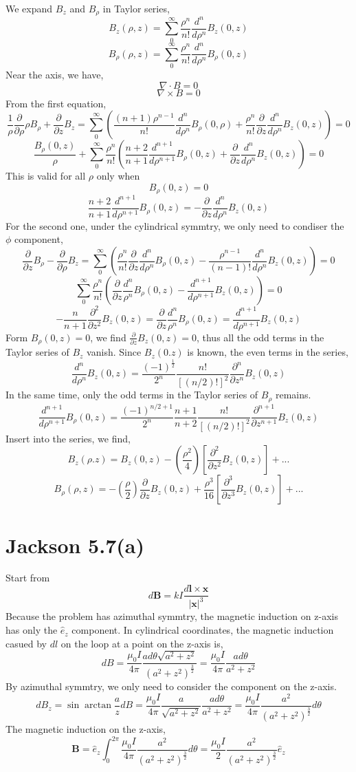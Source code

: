 \documentclass{article}
\newcommand{\pd}[2]{\frac{\partial#1}{\partial#2}}
\begin{document}
We expand $B_z$ and $B_\rho$ in Taylor series,
\[ B_z(\rho,z)=\sum_0^{\infty}\frac{\rho^n}{n!}\frac{d^n}{d\rho^n}B_z(0,z) \]
\[ B_\rho(\rho,z)=\sum_0^\infty\frac{\rho^n}{n!}\frac{d^n}{d\rho^n}B_\rho(0,z) \]
Near the axis, we have,
\[\nabla\cdot B=0 \]
\[\nabla\times B=0 \]
From the first equation,
\[ \frac{1}{\rho}\pd{}{\rho}\rho B_\rho+\pd{}{z}B_z=\sum_0^{\infty}(\frac{(n+1)\rho^{n-1}}{n!}\frac{d^n}{d\rho^n}B_\rho(0,\rho)+\frac{\rho^n}{n!}\pd{}{z}\frac{d^n}{d\rho^n}B_z(0,z))=0\]
\[ \frac{B_\rho(0,z)}{\rho}+\sum_0^\infty\frac{\rho^n}{n!}(\frac{n+2}{n+1}\frac{d^{n+1}}{d\rho^{n+1}}B_\rho(0,z)+\pd{}{z}\frac{d^n}{d\rho^n}B_z(0,z))=0 \]
This is valid for all $\rho$ only when
\[ B_\rho(0,z)=0\]
\[ \frac{n+2}{n+1}\frac{d^{n+1}}{d\rho^{n+1}}B_\rho(0,z)=-\pd{}{z}\frac{d^n}{d\rho^n}B_z(0,z) \]
For the second one, under the cylindrical symmtry, we only need to condiser the $\phi$ component,
\[ \pd{}{z}B_\rho-\pd{}{\rho}B_z=\sum_0^\infty(\frac{\rho^n}{n!}\pd{}{z}\frac{d^n}{d\rho^n}B_\rho(0,z)-\frac{\rho^{n-1}}{(n-1)!}\frac{d^n}{d\rho^n}B_z(0,z))=0 \]
\[ \sum_0^\infty\frac{\rho^n}{n!}(\pd{}{z}\frac{d^n}{\rho^n}B_\rho(0,z)-\frac{d^{n+1}}{d\rho^{n+1}}B_z(0,z))=0 \]
\[ -\frac{n}{n+1}\pd{^2}{z^2}B_z(0,z)=\pd{}{z}\frac{d^n}{\rho^n}B_\rho(0,z)=\frac{d^{n+1}}{d\rho^{n+1}}B_z(0,z)\]
Form $B_\rho(0,z)=0$, we find $\pd{}{z}B_z(0,z)=0$, thus all the odd terms in the Taylor series of $B_z$ vanish. Since $B_z(0.z)$ is known, the even terms in the series,
\[ \frac{d^n}{d\rho^n}B_z(0,z)=\frac{(-1)^{\frac 12}}{2^n}\frac{n!}{[(n/2)!]^2}\pd{^n}{z^n}B_z(0,z) \]
In the same time, only the odd terms in the Taylor series of $B_\rho$ remains.
\[ \frac{d^{n+1}}{d\rho^{n+1}}B_\rho(0,z)=\frac{(-1)^{n/2+1}}{2^n}\frac{n+1}{n+2}\frac{n!}{[(n/2)!]^{2}}\pd{^{n+1}}{z^{n+1}}B_z(0,z)\]
Insert into the series, we find,
\[ B_z(\rho.z)=B_z(0,z)-(\frac{\rho^2}{4})[\pd{^2}{z^2}B_z(0,z)]+...\]
\[ B_\rho(\rho,z)=-(\frac{\rho}{2})\pd{}{z}B_z(0,z)+\frac{\rho^3}{16}[\pd{^3}{z^3}B_z(0,z)]+...\]
\pagebreak

\section*{Jackson 5.7(a)}

Start from
\[ d\bm B=kI\frac{d\bm l\times\bm x}{|\bm x|^3} \]
Because the problem has azimuthal symmtry, the magnetic induction on z-axis has only the $\hat e_z$ component. In cylindrical coordinates, the magnetic induction casued by $dl$ on the loop at a point on the z-axis is,
\[ dB=\frac{\mu_0I}{4\pi}\frac{ad\theta\sqrt{a^2+z^2}}{(a^2+z^2)^{\frac 32}}=\frac{\mu_0I}{4\pi}\frac{ad\theta}{a^2+z^2} \]
By azimuthal symmtry, we only need to consider the component on the z-axis.
\[ dB_z=\sin\arctan\frac az dB=\frac{\mu_0I}{4\pi}\frac{a}{\sqrt{a^2+z^2}}\frac{ad\theta}{a^2+z^2}=\frac{\mu_0I}{4\pi}\frac{a^2}{(a^2+z^2)^{\frac 32}}d\theta \]
The magnetic induction on the z-axis,
\[ \boxed{\bm B=\hat e_z\int_0^{2\pi}\frac{\mu_0I}{4\pi}\frac{a^2}{(a^2+z^2)^{\frac 32}}d\theta=\frac{\mu_0I}{2}\frac{a^2}{(a^2+z^2)^{\frac 32}}\hat e_z} \]
\end{document}
